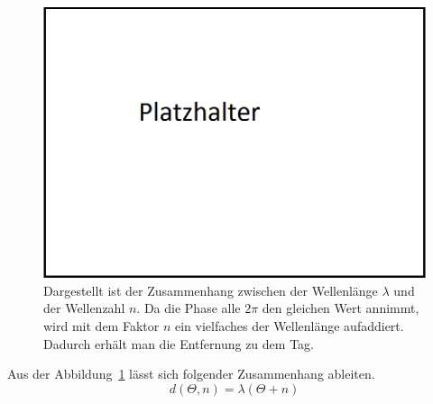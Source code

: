 \begin{figure} [h]
\centering
         \caption[Zusammenhang Wellenlänge - Wellenzahl]{Dargestellt ist der Zusammenhang zwischen der Wellenlänge $\lambda$ und der Wellenzahl $n$. Da die Phase alle $2\pi$ den gleichen Wert annimmt, wird mit dem Faktor $n$ ein vielfaches der Wellenlänge aufaddiert. Dadurch erhält man die Entfernung zu dem Tag.}
         \label{fig:wavenumber_wavelength}
         \vspace{0.5cm}
         \includegraphics[width=\textwidth]{img/00_placeholder.png}
%      
\end{figure}

Aus der Abbildung~\ref{fig:wavenumber_wavelength} lässt sich folgender Zusammenhang ableiten.
%
\begin{equation}
	d(\Theta, n)=\lambda(\Theta+n)
\end{equation}

\lipsum[1]
